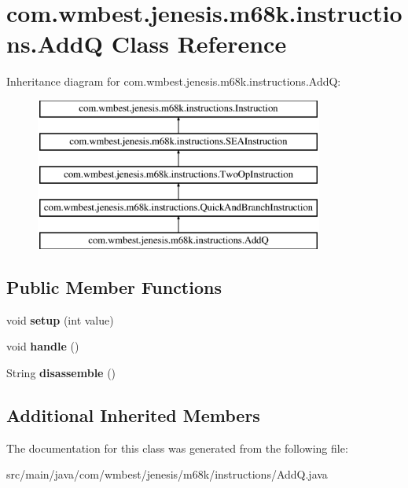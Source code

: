 \hypertarget{classcom_1_1wmbest_1_1jenesis_1_1m68k_1_1instructions_1_1AddQ}{\section{com.\-wmbest.\-jenesis.\-m68k.\-instructions.\-Add\-Q Class Reference}
\label{classcom_1_1wmbest_1_1jenesis_1_1m68k_1_1instructions_1_1AddQ}
}
Inheritance diagram for com.\-wmbest.\-jenesis.\-m68k.\-instructions.\-Add\-Q\-:\begin{figure}[H]
\begin{center}
\leavevmode
\includegraphics[height=5.000000cm]{classcom_1_1wmbest_1_1jenesis_1_1m68k_1_1instructions_1_1AddQ}
\end{center}
\end{figure}
\subsection*{Public Member Functions}
\begin{DoxyCompactItemize}
\item 
\hypertarget{classcom_1_1wmbest_1_1jenesis_1_1m68k_1_1instructions_1_1AddQ_a6e20b1c7f1fbb28b94fcd653a0c0e03e}{void {\bfseries setup} (int value)}\label{classcom_1_1wmbest_1_1jenesis_1_1m68k_1_1instructions_1_1AddQ_a6e20b1c7f1fbb28b94fcd653a0c0e03e}

\item 
\hypertarget{classcom_1_1wmbest_1_1jenesis_1_1m68k_1_1instructions_1_1AddQ_af29c0fb97d0daaffe7e8754ee6977f1c}{void {\bfseries handle} ()}\label{classcom_1_1wmbest_1_1jenesis_1_1m68k_1_1instructions_1_1AddQ_af29c0fb97d0daaffe7e8754ee6977f1c}

\item 
\hypertarget{classcom_1_1wmbest_1_1jenesis_1_1m68k_1_1instructions_1_1AddQ_a6c438baa32b6d8e80b26f07ab6f07a57}{String {\bfseries disassemble} ()}\label{classcom_1_1wmbest_1_1jenesis_1_1m68k_1_1instructions_1_1AddQ_a6c438baa32b6d8e80b26f07ab6f07a57}

\end{DoxyCompactItemize}
\subsection*{Additional Inherited Members}


The documentation for this class was generated from the following file\-:\begin{DoxyCompactItemize}
\item 
src/main/java/com/wmbest/jenesis/m68k/instructions/Add\-Q.\-java\end{DoxyCompactItemize}
